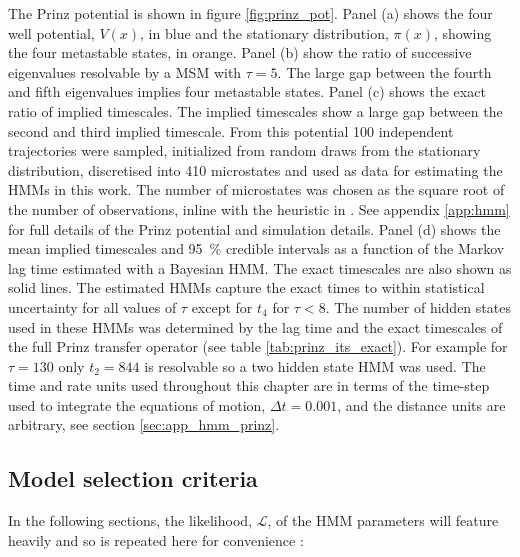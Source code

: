 The Prinz potential \cite{prinzMarkovModelsMolecular2011} is shown in figure \ref{fig:prinz_pot}.  Panel (a) shows the four well potential, $V(x)$, in blue and the stationary distribution, $\pi(x)$, showing the four metastable states, in orange. Panel (b) show the  ratio of successive eigenvalues resolvable by a  MSM with $\tau=5$. The large gap between the fourth and fifth eigenvalues implies four metastable states. Panel (c) shows the exact ratio of implied timescales. The implied timescales show a large gap between the second and third implied timescale. From this potential \num{100} independent trajectories were sampled, initialized from random draws from the stationary distribution, discretised into \num{410} microstates and used as data for estimating the HMMs in this work. The number of microstates was chosen as the square root of the number of observations, inline with the heuristic in \cite{husicWardClusteringImproves2017a}. See appendix \ref{app:hmm} for full details of the Prinz potential and simulation details. Panel (d) shows the mean implied timescales and \SI{95}{\percent} credible intervals as a function of the Markov lag time estimated with a Bayesian HMM. The exact timescales are also shown as solid lines. The estimated HMMs capture the exact times to within statistical uncertainty for all values of $\tau$ except for $t_{4}$ for $\tau < 8$. The number of hidden states used in these HMMs was determined by the lag time and the exact timescales of the full Prinz transfer operator (see table \ref{tab:prinz_its_exact}). For example for $\tau = 130$ only $t_2 = 844$ is resolvable so a two hidden state HMM was used. The time and rate units used throughout this chapter are in terms of the time-step used to integrate the equations of motion, $\Delta t = 0.001$, and the distance units are arbitrary, see section \ref{sec:app_hmm_prinz}.

\subsection{Model selection criteria}

In the following sections, the likelihood, $\mathcal{L}$, of the HMM parameters will feature heavily and so is repeated here for convenience \cite{noeProjectedHiddenMarkov2013a}: 

